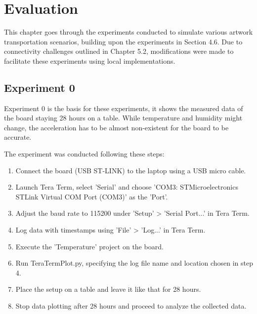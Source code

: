 \chapter{Evaluation}

This chapter goes through the experiments conducted to simulate various artwork transportation scenarios, building upon the experiments in Section 4.6. Due to connectivity challenges outlined in Chapter 5.2, modifications were made to facilitate these experiments using local implementations.

\section{Experiment 0}

Experiment 0 is the basis for these experiments, it shows the measured data of the board staying 28 hours on a table. While temperature and humidity might change, the acceleration has to be almost non-existent for the board to be accurate.

The experiment was conducted following these steps:

\begin{enumerate}
\item Connect the board (USB ST-LINK) to the laptop using a USB micro cable.
\item Launch Tera Term, select 'Serial' and choose 'COM3: STMicroelectronics STLink Virtual COM Port (COM3)' as the 'Port'.
\item Adjust the baud rate to 115200 under 'Setup' > 'Serial Port...' in Tera Term.
\item Log data with timestamps using 'File' > 'Log...' in Tera Term.
\item Execute the 'Temperature' project on the board.
\item Run TeraTermPlot.py, specifying the log file name and location chosen in step 4.
\item Place the setup on a table and leave it like that for 28 hours.
\item Stop data plotting after 28 hours and proceed to analyze the collected data.
\end{enumerate}

